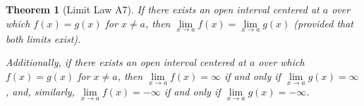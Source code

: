 \documentclass[12pt,]{book}
\theoremstyle{plain}
\newtheorem{theorem}{Theorem}[section]
\theoremstyle{definition}
\theoremstyle{definition}
\theoremstyle{definition}
\theoremstyle{definition}
\theoremstyle{definition}
\numberwithin{equation}{section}
\newcommand{\fe}[2]{#1\mathopen{}\left(#2\right)\mathclose{}}
\begin{document}
\begin{theorem}[{Limit Law A7}]\label{lla7}
If there exists an open interval centered at \(a\) over which \(\fe{f}{x}=\fe{g}{x}\) for \(x\neq a\), then \(\lim\limits_{x\to a}\fe{f}{x}=\lim\limits_{x\to a}\fe{g}{x}\) (provided that both limits exist).%
\par
Additionally, if there exists an open interval centered at \(a\) over which \(\fe{f}{x}=\fe{g}{x}\) for \(x\neq a\), then \(\lim\limits_{x\to a}\fe{f}{x}=\infty\) if and only if \(\lim\limits_{x\to a}\fe{g}{x}=\infty\), and, similarly, \(\lim\limits_{x\to a}\fe{f}{x}=-\infty\) if and only if \(\lim\limits_{x\to a}\fe{g}{x}=-\infty\).%
\end{theorem}
\typeout{************************************************}
\typeout{************************************************}
\end{document}
